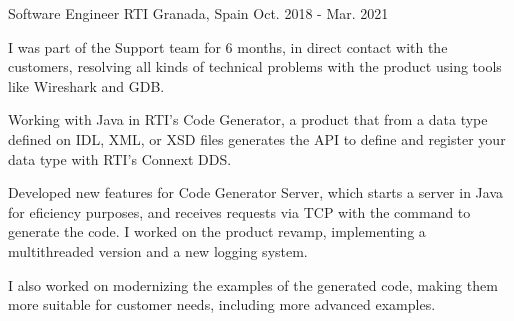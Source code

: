 

\begin{cventries}

  \cventry
    {Software Engineer} %
    {RTI} %
    {Granada, Spain} %
    {Oct. 2018 - Mar. 2021} %
    {
      \begin{cvitems} %
        \item {I was part of the Support team for 6 months, in direct contact with the customers,
              resolving all kinds of technical problems with the product using tools like Wireshark and GDB.} 
        \item {Working with Java in RTI’s Code Generator, a product that from a data type defined on IDL, XML, or XSD files
              generates the API to define and register your data type with RTI’s Connext DDS.}
        \item {Developed new features for Code Generator Server, which starts a server in Java for eficiency purposes,
              and receives requests via TCP with the command to generate the code. I worked on the product revamp,
              implementing a multithreaded version and a new logging system.}
        \item {I also worked on modernizing the examples of the generated code, 
              making them more suitable for customer needs, including more advanced examples.}
      \end{cvitems}
    }

\end{cventries}
